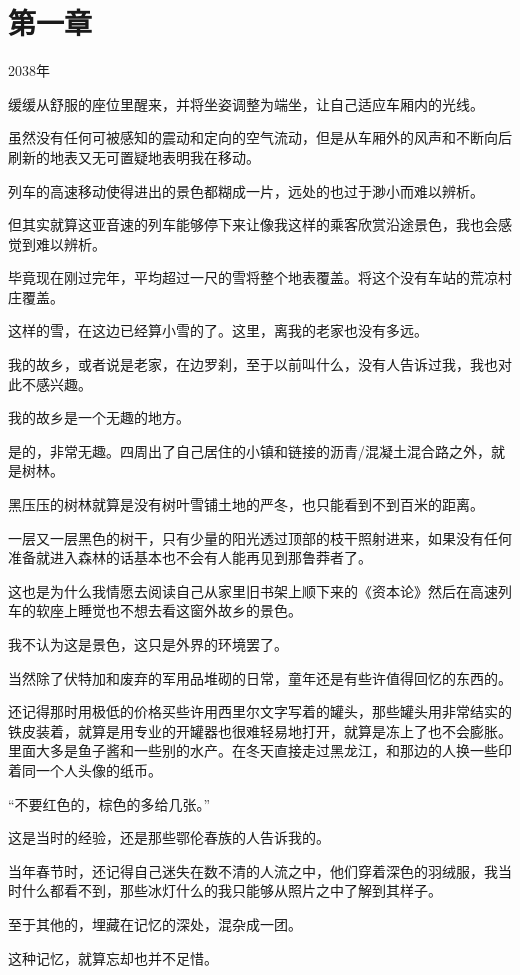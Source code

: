 \chapter[first chapter]{第一章}
\centerline{2038年}
缓缓从舒服的座位里醒来，并将坐姿调整为端坐，让自己适应车厢内的光线。

虽然没有任何可被感知的震动和定向的空气流动，但是从车厢外的风声和不断向后刷新的地表又无可置疑地表明我在移动。

列车的高速移动使得进出的景色都糊成一片，远处的也过于渺小而难以辨析。

但其实就算这亚音速的列车能够停下来让像我这样的乘客欣赏沿途景色，我也会感觉到难以辨析。

毕竟现在刚过完年，平均超过一尺的雪将整个地表覆盖。将这个没有车站的荒凉村庄覆盖。

这样的雪，在这边已经算小雪的了。这里，离我的老家也没有多远。

我的故乡，或者说是老家，在边罗刹，至于以前叫什么，没有人告诉过我，我也对此不感兴趣。

我的故乡是一个无趣的地方。

是的，非常无趣。四周出了自己居住的小镇和链接的沥青/混凝土混合路之外，就是树林。

黑压压的树林就算是没有树叶雪铺土地的严冬，也只能看到不到百米的距离。

一层又一层黑色的树干，只有少量的阳光透过顶部的枝干照射进来，如果没有任何准备就进入森林的话基本也不会有人能再见到那鲁莽者了。

这也是为什么我情愿去阅读自己从家里旧书架上顺下来的《资本论》然后在高速列车的软座上睡觉也不想去看这窗外故乡的景色。

我不认为这是景色，这只是外界的环境罢了。

当然除了伏特加和废弃的军用品堆砌的日常，童年还是有些许值得回忆的东西的。

还记得那时用极低的价格买些许用西里尔文字写着的罐头，那些罐头用非常结实的铁皮装着，就算是用专业的开罐器也很难轻易地打开，就算是冻上了也不会膨胀。里面大多是鱼子酱和一些别的水产。在冬天直接走过黑龙江，和那边的人换一些印着同一个人头像的纸币。

“不要红色的，棕色的多给几张。”

这是当时的经验，还是那些鄂伦春族的人告诉我的。

当年春节时，还记得自己迷失在数不清的人流之中，他们穿着深色的羽绒服，我当时什么都看不到，那些冰灯什么的我只能够从照片之中了解到其样子。

至于其他的，埋藏在记忆的深处，混杂成一团。

这种记忆，就算忘却也并不足惜。

